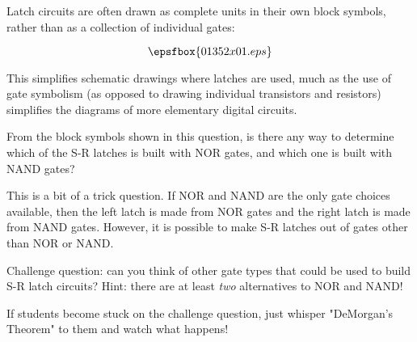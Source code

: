 

Latch circuits are often drawn as complete units in their own block symbols, rather than as a collection of individual gates:

$$\epsfbox{01352x01.eps}$$

This simplifies schematic drawings where latches are used, much as the use of gate symbolism (as opposed to drawing individual transistors and resistors) simplifies the diagrams of more elementary digital circuits.

From the block symbols shown in this question, is there any way to determine which of the S-R latches is built with NOR gates, and which one is built with NAND gates?







This is a bit of a trick question.  If NOR and NAND are the only gate choices available, then the left latch is made from NOR gates and the right latch is made from NAND gates.  However, it is possible to make S-R latches out of gates other than NOR or NAND.  

\vskip 10pt

Challenge question: can you think of other gate types that could be used to build S-R latch circuits?  Hint: there are at least {\it two} alternatives to NOR and NAND!







If students become stuck on the challenge question, just whisper "DeMorgan's Theorem" to them and watch what happens!



